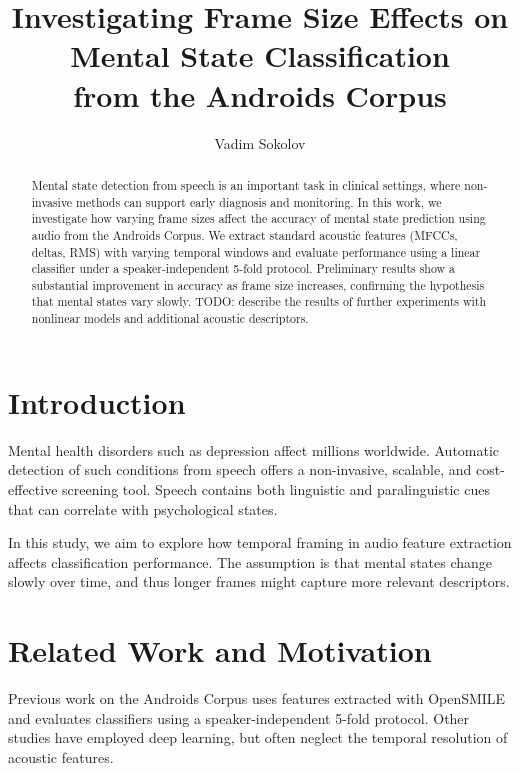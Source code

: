 \documentclass[conference]{IEEEtran}
\begin{document}
\title{\textbf{Investigating Frame Size Effects on Mental State Classification\\ from the Androids Corpus}}


\author{Vadim Sokolov}
\date{}

\maketitle

\begin{abstract}
Mental state detection from speech is an important task in clinical settings, where non-invasive methods can support early diagnosis and monitoring. 
In this work, we investigate how varying frame sizes affect the accuracy of mental state prediction using audio from the Androids Corpus. 
We extract standard acoustic features (MFCCs, deltas, RMS) with varying temporal windows and evaluate performance using a linear classifier under a speaker-independent 5-fold protocol. 
Preliminary results show a substantial improvement in accuracy as frame size increases, confirming the hypothesis that mental states vary slowly. 
TODO: describe the results of further experiments with nonlinear models and additional acoustic descriptors.
\end{abstract}

\section{Introduction}
Mental health disorders such as depression affect millions worldwide. 
Automatic detection of such conditions from speech offers a non-invasive, scalable, and cost-effective screening tool. 
Speech contains both linguistic and paralinguistic cues that can correlate with psychological states.

In this study, we aim to explore how temporal framing in audio feature extraction affects classification performance. 
The assumption is that mental states change slowly over time, and thus longer frames might capture more relevant descriptors.

\section{Related Work and Motivation}
Previous work on the Androids Corpus \cite{androids2021} uses features extracted with OpenSMILE and evaluates classifiers using a speaker-independent 5-fold protocol. Other studies have employed deep learning, but often neglect the temporal resolution of acoustic features.
\end{document}
